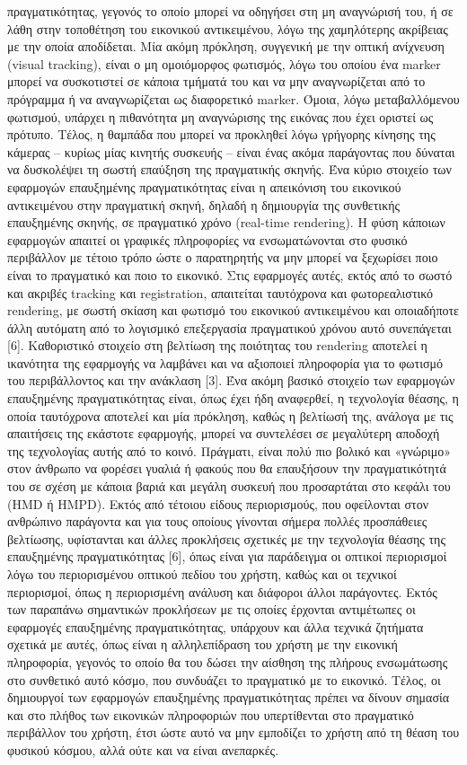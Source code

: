 πραγματικότητας, γεγονός το οποίο μπορεί να οδηγήσει στη μη αναγνώρισή του, ή σε λάθη στην τοποθέτηση του εικονικού αντικειμένου, λόγω της χαμηλότερης ακρίβειας με την οποία αποδίδεται. Μία ακόμη πρόκληση, συγγενική με την οπτική ανίχνευση (visual tracking), είναι ο μη ομοιόμορφος φωτισμός, λόγω του οποίου ένα marker μπορεί να συσκοτιστεί σε κάποια τμήματά του και να μην αναγνωρίζεται από το πρόγραμμα ή να αναγνωρίζεται ως διαφορετικό marker. Όμοια, λόγω μεταβαλλόμενου φωτισμού, υπάρχει η πιθανότητα μη αναγνώρισης της εικόνας που έχει οριστεί ως πρότυπο. Τέλος, η θαμπάδα που μπορεί να προκληθεί λόγω γρήγορης κίνησης της κάμερας – κυρίως μίας κινητής συσκευής – είναι ένας ακόμα παράγοντας που δύναται να δυσκολέψει τη σωστή επαύξηση της πραγματικής σκηνής. Ένα κύριο στοιχείο των εφαρμογών επαυξημένης πραγματικότητας είναι η απεικόνιση του εικονικού αντικειμένου στην πραγματική σκηνή, δηλαδή η δημιουργία της συνθετικής επαυξημένης σκηνής, σε πραγματικό χρόνο (real-time rendering). Η φύση κάποιων εφαρμογών απαιτεί οι γραφικές πληροφορίες να ενσωματώνονται στο φυσικό περιβάλλον με τέτοιο τρόπο ώστε ο παρατηρητής να μην μπορεί να ξεχωρίσει ποιο είναι το πραγματικό και ποιο το εικονικό. Στις εφαρμογές αυτές, εκτός από το σωστό και ακριβές tracking και registration, απαιτείται ταυτόχρονα και φωτορεαλιστικό rendering, με σωστή σκίαση και φωτισμό του εικονικού αντικειμένου και οποιαδήποτε άλλη αυτόματη από το λογισμικό επεξεργασία πραγματικού χρόνου αυτό συνεπάγεται [6]. Καθοριστικό στοιχείο στη βελτίωση της ποιότητας του rendering αποτελεί η ικανότητα της εφαρμογής να λαμβάνει και να αξιοποιεί πληροφορία για το φωτισμό του περιβάλλοντος και την ανάκλαση [3]. Ένα ακόμη βασικό στοιχείο των εφαρμογών επαυξημένης πραγματικότητας είναι, όπως έχει ήδη αναφερθεί, η τεχνολογία θέασης, η οποία ταυτόχρονα αποτελεί και μία πρόκληση, καθώς η βελτίωσή της, ανάλογα με τις απαιτήσεις της εκάστοτε εφαρμογής, μπορεί να συντελέσει σε μεγαλύτερη αποδοχή της τεχνολογίας αυτής από το κοινό. Πράγματι, είναι πολύ πιο βολικό και «γνώριμο» στον άνθρωπο να φορέσει γυαλιά ή φακούς που θα επαυξήσουν την πραγματικότητά του σε σχέση με κάποια βαριά και μεγάλη συσκευή που προσαρτάται στο κεφάλι του (HMD ή HMPD). Εκτός από τέτοιου είδους περιορισμούς, που οφείλονται στον ανθρώπινο παράγοντα και για τους οποίους γίνονται σήμερα πολλές προσπάθειες βελτίωσης, υφίστανται και άλλες προκλήσεις σχετικές με την τεχνολογία θέασης της επαυξημένης πραγματικότητας [6], όπως είναι για παράδειγμα οι οπτικοί περιορισμοί λόγω του περιορισμένου οπτικού πεδίου του χρήστη, καθώς και οι τεχνικοί περιορισμοί, όπως η περιορισμένη ανάλυση και διάφοροι άλλοι παράγοντες. Εκτός των παραπάνω σημαντικών προκλήσεων με τις οποίες έρχονται αντιμέτωπες οι εφαρμογές επαυξημένης πραγματικότητας, υπάρχουν και άλλα τεχνικά ζητήματα σχετικά με αυτές, όπως είναι η αλληλεπίδραση του χρήστη με την εικονική πληροφορία, γεγονός το οποίο θα του δώσει την αίσθηση της πλήρους ενσωμάτωσης στο συνθετικό αυτό κόσμο, που συνδυάζει το πραγματικό με το εικονικό. Τέλος, οι δημιουργοί των εφαρμογών επαυξημένης πραγματικότητας πρέπει να δίνουν σημασία και στο πλήθος των εικονικών πληροφοριών που υπερτίθενται στο πραγματικό περιβάλλον του χρήστη, έτσι ώστε αυτό να μην εμποδίζει το χρήστη από τη θέαση του φυσικού κόσμου, αλλά ούτε και να είναι ανεπαρκές.
 
